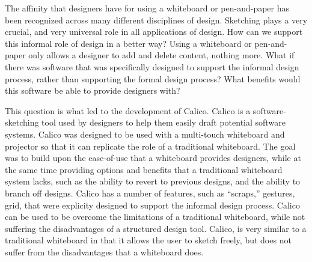 The affinity that designers have for using a whiteboard or pen-and-paper has been recognized across many different disciplines of design. 
Sketching plays a very crucial, and very universal role in all applications of design. 
How can we support this informal role of design in a better way?
Using a whiteboard or pen-and-paper only allows a designer to add and delete content, nothing more.
What if there was software that was specifically designed to support the informal design process, rather than supporting the formal design process? 
What benefits would this software be able to provide designers with?

This question is what led to the development of Calico. 
Calico is a software-sketching tool used by designers to help them easily draft potential software systems. 
Calico was designed to be used with a multi-touch whiteboard and projector so that it can replicate the role of a traditional whiteboard. 
The goal was to build upon the ease-of-use that a whiteboard provides designers, while at the same time providing options and benefits that a traditional whiteboard system lacks, such as the ability to revert to previous designs, and the ability to branch off designs. 
Calico has a number of features, such as ``scraps,'' gestures, grid, that were explicity designed to support the informal design process.
Calico can be used to be overcome the limitations of a traditional whiteboard, while not suffering the disadvantages of a structured design tool. 
Calico, is very similar to a traditional whiteboard in that it allows the user to sketch freely, but does not suffer from the disadvantages that a whiteboard does.

